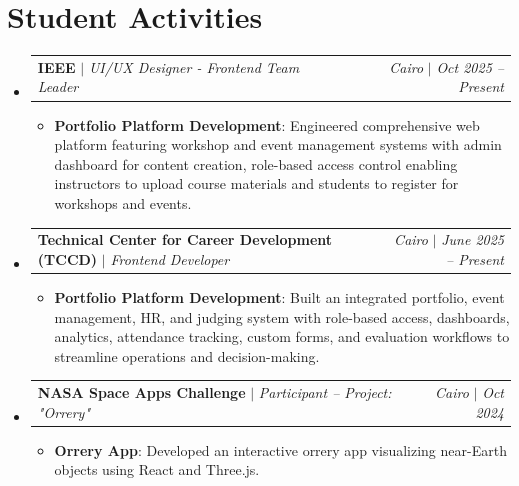 \documentclass[letterpaper,10pt]{article}
\makeatletter
\newcommand{\resumeItem}[2]{\item\footnotesize{\textbf{#1}{: #2 \vspace{-3pt}}}}
\newcommand{\resumeActivitySubheading}[4]{
  \vspace{-1pt}\item
    \begin{tabular*}{1.0\textwidth}{l@{\extracolsep{\fill}}r}
      \textbf{#1} $|$ \textit{\footnotesize#3} & \textit{\footnotesize#2} $|$ \textit{\footnotesize #4} \\
    \end{tabular*}\vspace{-7pt}
}
\newcommand{\resumeSubHeadingListStart}{\begin{itemize}[leftmargin=*]}
\newcommand{\resumeSubHeadingListEnd}{\end{itemize}}
\newcommand{\resumeItemListStart}{\begin{itemize}}
\newcommand{\resumeItemListEnd}{\end{itemize}\vspace{-8pt}}
\makeatother
\begin{document}
\section{Student Activities}
  \resumeSubHeadingListStart
    \resumeActivitySubheading
      {IEEE}{Cairo}{UI/UX Designer - Frontend Team Leader}{Oct 2025 -- Present}
      \resumeItemListStart
        \resumeItem{Portfolio Platform Development}
          {Engineered comprehensive web platform featuring workshop and event management systems with admin dashboard for content creation, role-based access control enabling instructors to upload course materials and students to register for workshops and events.}
      \resumeItemListEnd
    \vspace{1pt}
    \resumeActivitySubheading
      {Technical Center for Career Development (TCCD)}{Cairo}{Frontend Developer}{June 2025 -- Present}
      \resumeItemListStart
        \resumeItem{Portfolio Platform Development}
          {Built an integrated portfolio, event management, HR, and judging system with role-based access, dashboards, analytics, attendance tracking, custom forms, and evaluation workflows to streamline operations and decision-making.}
      \resumeItemListEnd
    \vspace{1pt}
    \resumeActivitySubheading
      {NASA Space Apps Challenge}{Cairo}{Participant -- Project: "Orrery"}{Oct 2024}
      \resumeItemListStart
        \resumeItem{Orrery App}
          {Developed an interactive orrery app visualizing near-Earth objects using React and Three.js.}
      \resumeItemListEnd
  \resumeSubHeadingListEnd
\end{document}

